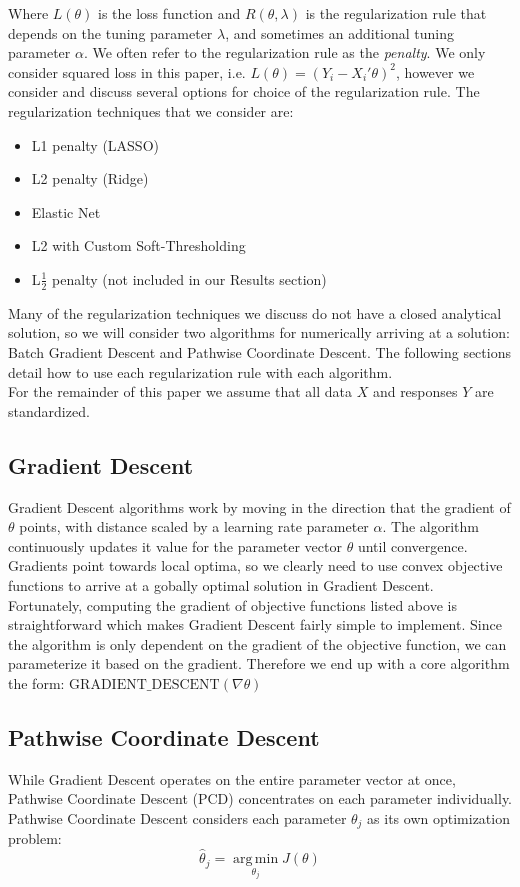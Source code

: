 \documentclass[11pt]{article}
\newcommand{\thh}{\hat{\theta}}
\DeclareMathOperator*{\argmin}{arg\,min}
\begin{document}
Where $L(\theta)$ is the loss function and $R(\theta,\lambda)$ is the regularization rule that depends on the tuning parameter $\lambda$, and sometimes an additional tuning parameter $\alpha$.  We often refer to the regularization rule as the \textit{penalty}.  We only consider squared loss in this paper, i.e. $L(\theta)= (Y_i - X_i'\theta)^2$, however we consider and discuss several options for choice of the regularization rule.  The regularization techniques that we consider are:
\begin{itemize}
	\item L1 penalty (LASSO)
	\item L2 penalty (Ridge)
	\item Elastic Net
	\item L2 with Custom Soft-Thresholding
	\item L$\frac{1}{2}$ penalty (not included in our Results section)
\end{itemize}

Many of the regularization techniques we discuss do not have a closed analytical solution, so we will consider two algorithms for numerically arriving at a solution: Batch Gradient Descent and Pathwise Coordinate Descent.  The following sections detail how to use each regularization rule with each algorithm.  \\

For the remainder of this paper we assume that all data $X$ and responses $Y$ are standardized.  

\subsection{Gradient Descent}
Gradient Descent algorithms work by moving in the direction that the gradient of $\theta$ points, with distance scaled by a learning rate parameter $\alpha$.  The algorithm continuously updates it value for the parameter vector $\theta$ until convergence.  Gradients point towards local optima, so we clearly need to use convex objective functions to arrive at a gobally optimal solution in Gradient Descent.  Fortunately, computing the gradient of objective functions listed above is straightforward which makes Gradient Descent fairly simple to implement.  Since the algorithm is only dependent on the gradient of the objective function, we can parameterize it based on the gradient.  Therefore we end up with a core algorithm the form: $\text{GRADIENT\_DESCENT}(\nabla\theta)$

\subsection{Pathwise Coordinate Descent}
While Gradient Descent operates on the entire parameter vector at once, Pathwise Coordinate Descent (PCD) concentrates on each parameter individually.  Pathwise Coordinate Descent considers each parameter $\theta_j$ as its own optimization problem\cite{ht}:
	$$\thh_j = \argmin\limits_{\theta_j} J(\theta)$$
\end{document}
